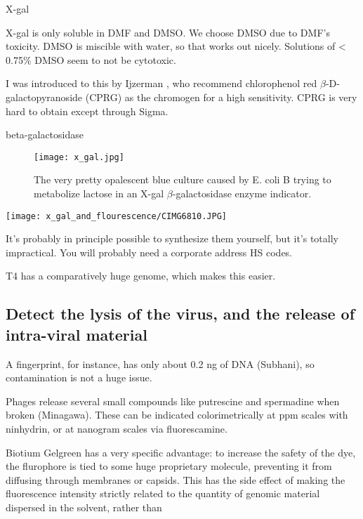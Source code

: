 \documentclass[paper.tex]{subfiles}
\begin{document}
X-gal \cite{Improved}


X-gal is only soluble in DMF and DMSO. We choose DMSO due to DMF's toxicity. DMSO is miscible with water, so that works out nicely. Solutions of < 0.75\% DMSO seem to not be cytotoxic.


I was introduced to this by Ijzerman \cite{liquid1993}, who recommend chlorophenol red $\beta$-D-galactopyranoside (CPRG) as the chromogen for a high sensitivity. CPRG is very hard to obtain except through Sigma.



beta-galactosidase



\begin{figure}[H]
	\captionsetup{singlelinecheck = false, justification=justified}
	\centering
	\texttt{[image: x\_gal.jpg]}
	\caption{The very pretty opalescent blue culture caused by E. coli B trying to metabolize lactose in an X-gal $\beta$-galactosidase enzyme indicator.}
\end{figure}




\texttt{[image: x\_gal\_and\_flourescence/CIMG6810.JPG]}

 It’s probably in principle possible to synthesize them yourself, but it’s totally impractical. You will probably need a corporate address HS codes. 

T4 has a comparatively huge genome, which makes this easier.


\subsection{Detect the lysis of the virus, and the release of intra-viral material}

A fingerprint, for instance, has only about 0.2 ng of DNA (Subhani), so contamination is not a huge issue.

Phages release several small compounds like putrescine and spermadine when broken (Minagawa\cite{characteristics1961}). These can be indicated colorimetrically at ppm scales with ninhydrin, or at nanogram scales via fluorescamine. 


Biotium Gelgreen has a very specific advantage: to increase the safety of the dye, the flurophore is tied to some huge proprietary molecule, preventing it from diffusing through membranes or capsids. This has the side effect of making the fluorescence intensity strictly related to the quantity of genomic material dispersed in the solvent, rather than 
\end{document}
